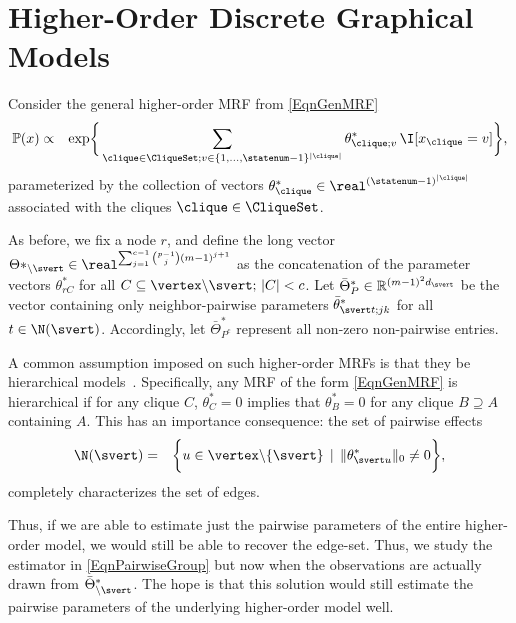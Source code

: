 \section{Higher-Order Discrete Graphical Models}\label{SecHigherOrder}

Consider the general higher-order MRF from \eqref{EqnGenMRF}
\begin{align*}
\mathbb{P}(x) & \propto & \exp \biggr \{\sum_{\clique \in \CliqueSet; v \in \{1, \ldots, \statenum-1 \}^{|\clique|}} \theta^*_{\clique;v} \, \I[x_\clique = v] \biggr \},
\end{align*}
parameterized by the collection of vectors $\theta^*_{\clique} \in \real^{(\statenum-1)^{|\clique|}}$ associated with the cliques $\clique \in \CliqueSet$. 

As before, we fix a node $r$, and define the long vector $\Theta*_{\backslash \svert} \in \real^{\sum_{j=1}^{c-1} \binom{p-1}{j} (m-1)^{j+1}}$ as the concatenation of the parameter vectors $\theta^*_{rC}$ for all $C \subseteq \vertex \backslash \svert;\, |C| < c$. Let $\bar{\Theta}^*_P\in\mathbb{R}^{(m-1)^2 d_\svert}$ be the vector containing only neighbor-pairwise parameters $\bar{\theta}^*_{\svert t;jk}$ for all $t\in\N(\svert)$. Accordingly, let $\bar{\Theta}^*_{P^c}$ represent all non-zero non-pairwise entries.


A common assumption imposed on such higher-order MRFs is that they be hierarchical models~\citep{Lauritzen}. Specifically, any MRF of the form \eqref{EqnGenMRF} is hierarchical if for any clique $C$, $\theta^*_{C} = 0$ implies that  $\theta^*_{B} = 0$ for any clique $B \supseteq A$ containing $A$. This has an importance consequence: the set of pairwise effects 
\begin{eqnarray*}
\N(\svert) & = & \biggr \{ u \in \vertex \backslash \{\svert\} \, \mid
\, \|\theta^*_{\svert u}\|_0 \neq 0 \biggr \},
\end{eqnarray*}
completely characterizes the set of edges. 


Thus, if we are able to estimate just the pairwise parameters of the entire higher-order model, we would still be able to recover the edge-set. Thus, we study the 
estimator in \eqref{EqnPairwiseGroup} but now when the observations are actually drawn from $\bar{\Theta}^*_{\backslash\svert}$. The hope is that this solution would still estimate the  pairwise parameters of the underlying higher-order model well. 

